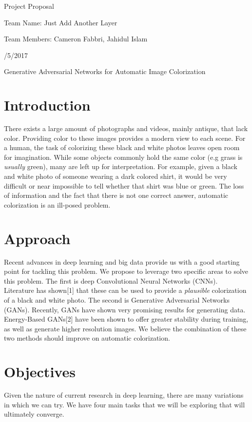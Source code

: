 \documentclass{article}
\begin{document}
\centerline{\sc \large Project Proposal}
\vspace{.5pc}
\centerline{\sc Team Name: Just Add Another Layer}
\centerline{\sc Team Members: Cameron Fabbri, Jahidul Islam}
\centerline{/5/2017}
\vspace{2pc}

\centerline{\sc \large Generative Adversarial Networks for Automatic Image Colorization }

\section{Introduction}
There exists a large amount of photographs and videos, mainly antique, that lack color.
Providing color to these images provides a modern view to each scene. For a human,
the task of colorizing these black and white photos leaves open room for imagination. While
some objects commonly hold the same color (e.g grass is \textit{usually} green), many are
left up for interpretation. For example, given a black and white photo of someone wearing a dark
colored shirt, it would be very difficult or near impossible to tell whether that shirt was
blue or green. The loss of information and the fact that there is not one correct answer,
automatic colorization is an ill-posed problem.

\section{Approach}
Recent advances in deep learning and big data provide us with a good starting point for tackling this
problem. We propose to leverage two specific areas to solve this problem. The first is deep Convolutional
Neural Networks (CNNs). Literature has shown[1] that these can be used to provide a \textit{plausible}
colorization of a black and white photo. The second is Generative Adversarial Networks (GANs). Recently,
GANs have shown very promising results for generating data. Energy-Based GANs[2] have been shown to
offer greater stability during training, as well as generate higher resolution images.
We believe the combination of these two methods should improve on automatic colorization.

\section{Objectives}
Given the nature of current research in deep learning, there are many variations in which we
can try. We have four main tasks that we will be exploring that will ultimately converge.
\end{document}
